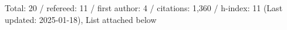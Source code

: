 Total: 20 / refereed: 11 / first author: 4 / citations: 1,360 / h-index: 11 (Last updated: 2025-01-18), List attached below